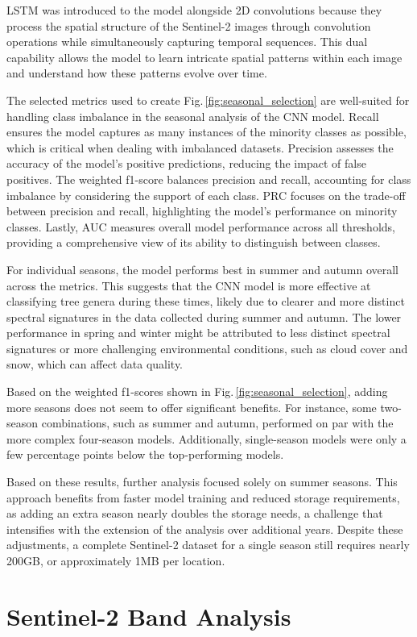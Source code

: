 LSTM was introduced to the model alongside 2D convolutions because they process the spatial structure of the Sentinel-2 images through convolution operations while simultaneously capturing temporal sequences. This dual capability allows the model to learn intricate spatial patterns within each image and understand how these patterns evolve over time.

The selected metrics used to create Fig.\,\ref{fig:seasonal_selection} are well-suited for handling class imbalance in the seasonal analysis of the CNN model. Recall ensures the model captures as many instances of the minority classes as possible, which is critical when dealing with imbalanced datasets. Precision assesses the accuracy of the model's positive predictions, reducing the impact of false positives. The weighted f1-score balances precision and recall, accounting for class imbalance by considering the support of each class. PRC focuses on the trade-off between precision and recall, highlighting the model's performance on minority classes. Lastly, AUC measures overall model performance across all thresholds, providing a comprehensive view of its ability to distinguish between classes.

For individual seasons, the model performs best in summer and autumn overall across the metrics. This suggests that the CNN model is more effective at classifying tree genera during these times, likely due to clearer and more distinct spectral signatures in the data collected during summer and autumn. The lower performance in spring and winter might be attributed to less distinct spectral signatures or more challenging environmental conditions, such as cloud cover and snow, which can affect data quality.

Based on the weighted f1-scores shown in Fig.\,\ref{fig:seasonal_selection}, adding more seasons does not seem to offer significant benefits. For instance, some two-season combinations, such as summer and autumn, performed on par with the more complex four-season models. Additionally, single-season models were only a few percentage points below the top-performing models.

Based on these results, further analysis focused solely on summer seasons. This approach benefits from faster model training and reduced storage requirements, as adding an extra season nearly doubles the storage needs, a challenge that intensifies with the extension of the analysis over additional years. Despite these adjustments, a complete Sentinel-2 dataset for a single season still requires nearly 200GB, or approximately  1MB per location.

\section{Sentinel-2 Band Analysis}

